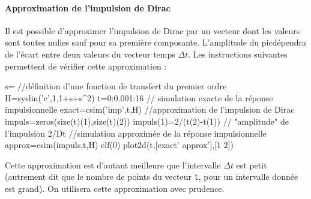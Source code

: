 \paragraph{Approximation de l'impulsion de Dirac}
Il est possible d'approximer l'impulsion de Dirac par un vecteur dont
les valeurs sont toutes nulles sauf pour sa première composante. 
L'amplitude du \og pic\fg dépendra de l'écart entre deux valeurs du vecteur 
temps $\Delta t$.
Les instructions suivantes permettent de vérifier cette approximation :
\begin{Scilabcode}
s=%
//définition d'une fonction de transfert du premier ordre
H=syslin('c',1,1+s+s^2)
t=0:0.001:16
// simulation exacte de la réponse impulsionnelle
exact=csim('imp',t,H)
//approximation de l'impulsion de Dirac
impuls=zeros(size(t)(1),size(t)(2))
impuls(1)=2/(t(2)-t(1))  // "amplitude" de l'impulsion 2/Dt  
//simulation approximée de la réponse impulsionnelle
approx=csim(impuls,t,H)
clf(0)
plot2d(t,[exact' approx'],[1 2])
\end{Scilabcode}
Cette approximation est d'autant meilleure que l'intervalle $\Delta t$ est 
petit (autrement dit que le nombre de points du vecteur \verb?t?, pour un 
intervalle donnée est grand). On utilisera cette approximation avec prudence.
